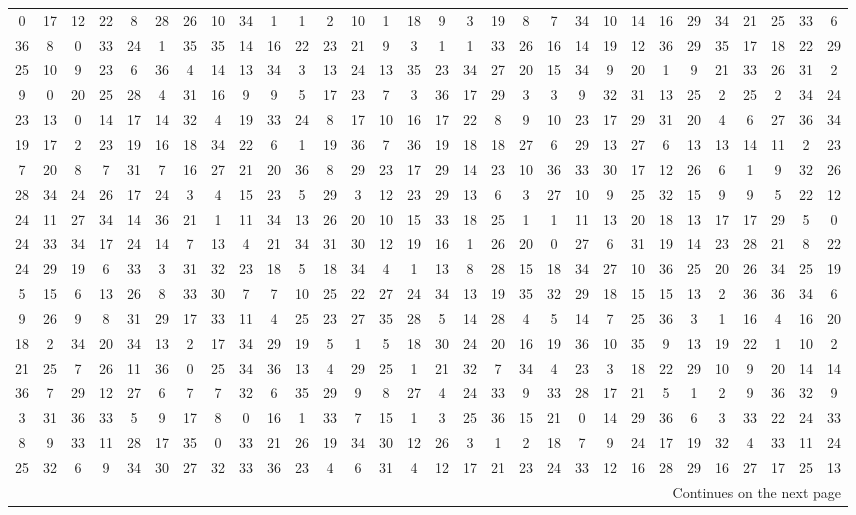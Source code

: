 \documentclass[11pt,twoside]{article}
\numberwithin{Theorem}{section}
\numberwithin{Definition}{section}
\numberwithin{Lemma}{section}
\numberwithin{Algorithm}{section}
\numberwithin{equation}{section}
\begin{document}
\begin{table}
\begin{tabular}{|*{30}{c|}}
0 &17 &12 &22 &8 &28 &26 &10 &34 &1 &1 &2 &10 &1 &18&9 &3 &19 &8 &7 &34 &10 &14 &16 &29 &34 &21 &25 &33 &6\\
36 &8 &0 &33 &24 &1 &35 &35 &14 &16 &22 &23 &21 &9 &3&1 &1 &33 &26 &16 &14 &19 &12 &36 &29 &35 &17 &18 &22 &29\\
25 &10 &9 &23 &6 &36 &4 &14 &13 &34 &3 &13 &24 &13 &35&23 &34 &27 &20 &15 &34 &9 &20 &1 &9 &21 &33 &26 &31 &2\\
9 &0 &20 &25 &28 &4 &31 &16 &9 &9 &5 &17 &23 &7 &3&36 &17 &29 &3 &3 &9 &32 &31 &13 &25 &2 &25 &2 &34 &24\\
23 &13 &0 &14 &17 &14 &32 &4 &19 &33 &24 &8 &17 &10 &16&17 &22 &8 &9 &10 &23 &17 &29 &31 &20 &4 &6 &27 &36 &34\\
19 &17 &2 &23 &19 &16 &18 &34 &22 &6 &1 &19 &36 &7 &36&19 &18 &18 &27 &6 &29 &13 &27 &6 &13 &13 &14 &11 &2 &23\\
7 &20 &8 &7 &31 &7 &16 &27 &21 &20 &36 &8 &29 &23 &17&29 &14 &23 &10 &36 &33 &30 &17 &12 &26 &6 &1 &9 &32 &26\\
28 &34 &24 &26 &17 &24 &3 &4 &15 &23 &5 &29 &3 &12 &23&29 &13 &6 &3 &27 &10 &9 &25 &32 &15 &9 &9 &5 &22 &12\\
24 &11 &27 &34 &14 &36 &21 &1 &11 &34 &13 &26 &20 &10 &15&33 &18 &25 &1 &1 &11 &13 &20 &18 &13 &17 &17 &29 &5 &0\\
24 &33 &34 &17 &24 &14 &7 &13 &4 &21 &34 &31 &30 &12 &19&16 &1 &26 &20 &0 &27 &6 &31 &19 &14 &23 &28 &21 &8 &22\\
24 &29 &19 &6 &33 &3 &31 &32 &23 &18 &5 &18 &34 &4 &1&13 &8 &28 &15 &18 &34 &27 &10 &36 &25 &20 &26 &34 &25 &19\\
5 &15 &6 &13 &26 &8 &33 &30 &7 &7 &10 &25 &22 &27 &24&34 &13 &19 &35 &32 &29 &18 &15 &15 &13 &2 &36 &36 &34 &6\\
9 &26 &9 &8 &31 &29 &17 &33 &11 &4 &25 &23 &27 &35 &28&5 &14 &28 &4 &5 &14 &7 &25 &36 &3 &1 &16 &4 &16 &20\\
18 &2 &34 &20 &34 &13 &2 &17 &34 &29 &19 &5 &1 &5 &18&30 &24 &20 &16 &19 &36 &10 &35 &9 &13 &19 &22 &1 &10 &2\\
21 &25 &7 &26 &11 &36 &0 &25 &34 &36 &13 &4 &29 &25 &1&21 &32 &7 &34 &4 &23 &3 &18 &22 &29 &10 &9 &20 &14 &14\\
36 &7 &29 &12 &27 &6 &7 &7 &32 &6 &35 &29 &9 &8 &27&4 &24 &33 &9 &33 &28 &17 &21 &5 &1 &2 &9 &36 &32 &9\\
3 &31 &36 &33 &5 &9 &17 &8 &0 &16 &1 &33 &7 &15 &1&3 &25 &36 &15 &21 &0 &14 &29 &36 &6 &3 &33 &22 &24 &33\\
8 &9 &33 &11 &28 &17 &35 &0 &33 &21 &26 &19 &34 &30 &12&26 &3 &1 &2 &18 &7 &9 &24 &17 &19 &32 &4 &33 &11 &24\\
25 &32 &6 &9 &34 &30 &27 &32 &33 &36 &23 &4 &6 &31 &4&12 &17 &21 &23 &24 &33 &12 &16 &28 &29 &16 &27 &17 &25 &13\\
  \hline
    \multicolumn{30}{r}{Continues on the next page} \\
      \end{tabular}
\end{table}
\end{document}
